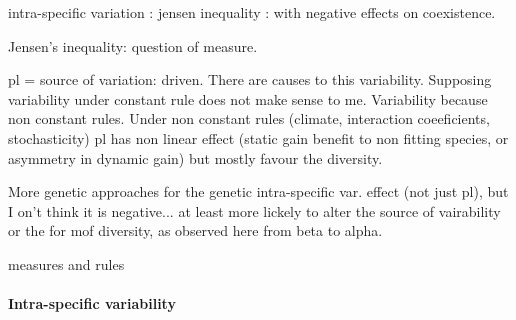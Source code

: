 intra-specific variation : jensen inequality : with negative effects on coexistence. 

Jensen's inequality: question of measure.

pl = source of variation: driven. There are causes to this variability. Supposing variability under constant rule does not make sense to me. Variability because non constant rules. Under non constant rules (climate, interaction coeeficients, stochasticity) pl has non linear effect (static gain benefit to non fitting species, or asymmetry in dynamic gain) but mostly favour the diversity.

More genetic approaches for the genetic intra-specific var. effect (not just pl), but I on't think it is negative... at least more lickely to alter the source of vairability or the for mof diversity, as observed here from beta to alpha.

measures and rules

\paragraph{Intra-specific variability}

